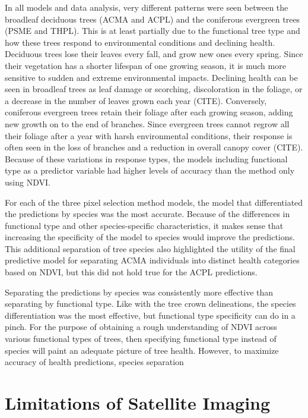 \documentclass[12pt,twoside]{reedthesis}
\begin{document}
In all models and data analysis, very different patterns were seen
between the broadleaf deciduous trees (ACMA and ACPL) and the coniferous
evergreen trees (PSME and THPL). This is at least partially due to the
functional tree type and how these trees respond to environmental
conditions and declining health. Deciduous trees lose their leaves every
fall, and grow new ones every spring. Since their vegetation has a
shorter lifespan of one growing season, it is much more sensitive to
sudden and extreme environmental impacts. Declining health can be seen
in broadleaf trees as leaf damage or scorching, discoloration in the
foliage, or a decrease in the number of leaves grown each year (CITE).
Conversely, coniferous evergreen trees retain their foliage after each
growing season, adding new growth on to the end of branches. Since
evergreen trees cannot regrow all their foliage after a year with harsh
environmental conditions, their response is often seen in the loss of
branches and a reduction in overall canopy cover (CITE). Because of
these variations in response types, the models including functional type
as a predictor variable had higher levels of accuracy than the method
only using NDVI.

For each of the three pixel selection method models, the model that
differentiated the predictions by species was the most accurate. Because
of the differences in functional type and other species-specific
characteristics, it makes sense that increasing the specificity of the
model to species would improve the predictions. This additional
separation of tree species also highlighted the utility of the final
predictive model for separating ACMA individuals into distinct health
categories based on NDVI, but this did not hold true for the ACPL
predictions.

Separating the predictions by species was consistently more effective
than separating by functional type. Like with the tree crown
delineations, the species differentiation was the most effective, but
functional type specificity can do in a pinch. For the purpose of
obtaining a rough understanding of NDVI across various functional types
of trees, then specifying functional type instead of species will paint
an adequate picture of tree health. However, to maximize accuracy of
health predictions, species separation

\hypertarget{limitations-of-satellite-imaging}{%
\section{Limitations of Satellite Imaging}\label{limitations-of-satellite-imaging}}
\end{document}
